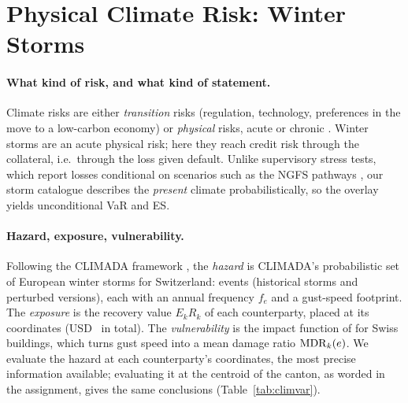 \section{Physical Climate Risk: Winter Storms}
\label{sec:climate}


\paragraph{What kind of risk, and what kind of statement.}
Climate risks are either \emph{transition} risks (regulation, technology, preferences in the move to a low-carbon economy) or \emph{physical} risks, acute or chronic \citep{Acharya23}. Winter storms are an acute physical risk; here they reach credit risk through the collateral, i.e.\ through the loss given default. Unlike supervisory stress tests, which report losses conditional on scenarios such as the NGFS pathways \citep{NGFS24}, our storm catalogue describes the \emph{present} climate probabilistically, so the overlay yields unconditional VaR and ES.

\paragraph{Hazard, exposure, vulnerability.}
Following the CLIMADA framework \citep{AznarSiguan19,HauserEtAl26}, the \emph{hazard} is CLIMADA's probabilistic set of European winter storms for Switzerland:  events (historical storms and perturbed versions), each with an annual frequency $f_e$ and a gust-speed footprint. The \emph{exposure} is the recovery value $E_kR_k$ of each counterparty, placed at its coordinates (USD~ in total). The \emph{vulnerability} is the impact function of \citet{Welker21} for Swiss buildings, which turns gust speed into a mean damage ratio $\mathrm{MDR}_k(e)$. We evaluate the hazard at each counterparty's coordinates, the most precise information available; evaluating it at the centroid of the canton, as worded in the assignment, gives the same conclusions (Table~\ref{tab:climvar}).

